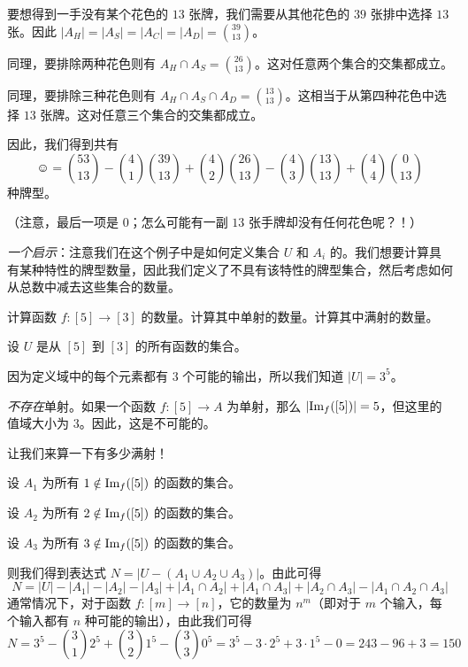 \begin{example}[桥牌]
    要想得到一手没有某个花色的 $13$ 张牌，我们需要从其他花色的 $39$ 张排中选择 $13$ 张。因此 $|A_H| = |A_S| = |A_C| = |A_D| = {39 \choose 13}$。

    同理，要排除两种花色则有 $A_H \cap A_S = {26 \choose 13}$。这对任意两个集合的交集都成立。

    同理，要排除三种花色则有 $A_H \cap A_S \cap A_D = {13 \choose 13}$。这相当于从第四种花色中选择 $13$ 张牌。这对任意三个集合的交集都成立。

    因此，我们得到共有
    \[\smiley{} = {53 \choose 13}-{4 \choose 1}{39 \choose 13}+{4 \choose 2}{26 \choose 13}-{4 \choose 3}{13 \choose 13}+{4 \choose 4}{0 \choose 13}\]
    种牌型。

    （注意，最后一项是 $0$；怎么可能有一副 $13$ 张手牌却没有任何花色呢？！）

    \emph{一个启示}：注意我们在这个例子中是如何定义集合 $U$ 和 $A_i$ 的。我们想要计算具有某种特性的牌型数量，因此我们定义了不具有该特性的牌型集合，然后考虑如何从总数中减去这些集合的数量。
\end{example}

\begin{example}[满射计数]

    计算函数 $f:[5] \to [3]$ 的数量。计算其中单射的数量。计算其中满射的数量。

    设 $U$ 是从 $[5]$ 到 $[3]$ 的所有函数的集合。

    因为定义域中的每个元素都有 $3$ 个可能的输出，所以我们知道 $|U| = 3^5$。

    \emph{不存在}单射。如果一个函数 $f : [5] \to A$ 为单射，那么 $|\text{Im}_f ([5])| = 5$，但这里的值域大小为 $3$。因此，这是不可能的。

    让我们来算一下有多少满射！

    设 $A_1$ 为所有 $1 \notin \text{Im}_f ([5])$ 的函数的集合。

    设 $A_2$ 为所有 $2 \notin \text{Im}_f ([5])$ 的函数的集合。

    设 $A_3$ 为所有 $3 \notin \text{Im}_f ([5])$ 的函数的集合。

    则我们得到表达式 $N = |U - (A_1 \cup A_2 \cup A_3)|$。由此可得
    \[N = |U| - |A_1| - |A_2| - |A_3| + |A_1 \cap A_2| + |A_1 \cap A_3| + |A_2 \cap A_3| - |A_1 \cap A_2 \cap A_3|\]
    通常情况下，对于函数 $f : [m] \to [n]$，它的数量为 $n^m$（即对于 $m$ 个输入，每个输入都有 $n$ 种可能的输出），由此我们可得
    \[N=3^5-{3 \choose 1}2^5+{3 \choose 2}1^5-{3 \choose 3}0^5=3^5-3 \cdot 2^5 + 3 \cdot 1^5 - 0 = 243 - 96 + 3 = 150\]
\end{example}

